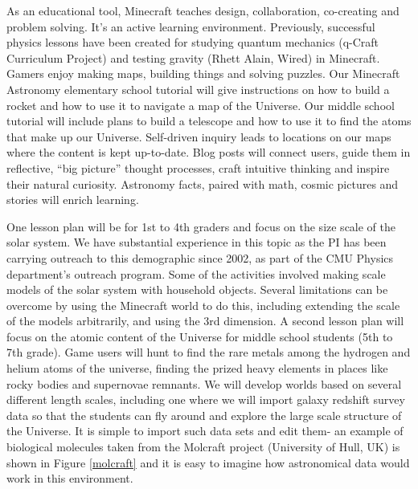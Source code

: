 As an educational tool, Minecraft teaches design, collaboration,
co-creating and problem solving. It’s an active learning
environment. Previously, successful physics lessons have been created
for studying quantum mechanics (q-Craft Curriculum Project) and
testing gravity (Rhett Alain, Wired) in Minecraft. Gamers enjoy making
maps, building things and solving puzzles.  Our Minecraft Astronomy
elementary school tutorial will give instructions on how to build a
rocket and how to use it to navigate a map of the Universe. 
Our middle school tutorial will include plans to build a
telescope and how to use it to find the atoms that make up our
Universe. Self-driven inquiry leads to locations on our maps where the
content is kept up-to-date.  Blog posts will connect users, guide them
in reflective, “big picture” thought processes, craft intuitive
thinking and inspire their natural curiosity.  Astronomy facts, paired
with math, cosmic pictures and stories will enrich learning.
 
One lesson plan will be  for 1st to 4th graders and
focus on the size scale of the solar system.  We have substantial
experience in this topic as the PI has been carrying outreach to this
demographic since 2002, as part of the CMU Physics department's
outreach program. Some of the  activities involved making
scale models of the solar system with household objects.  Several
limitations can be overcome by using the Minecraft world to do this,
including extending the scale of the models arbitrarily, and using the
3rd dimension.  A second lesson plan will focus on the atomic content
of the Universe for middle school students (5th to 7th grade). Game
users will hunt to find the rare metals among the hydrogen and helium
atoms of the universe, finding the prized heavy elements in places
like rocky bodies and supernovae remnants.  We will develop worlds
based on several different length scales, including one where we will
import galaxy redshift survey data  so that the
students can fly around and explore the large scale structure of the
Universe.  It is simple to import such data sets and edit them- an
example of biological molecules taken from the Molcraft project
(University of Hull, UK) is shown in Figure \ref{molcraft} and it is
easy to imagine how astronomical data would work in this environment.



